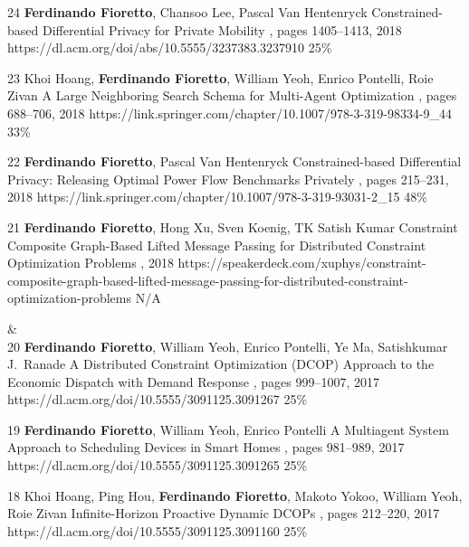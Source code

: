 \begin{pubs}
	\confentry
		{24} %
	  	{{\bf Ferdinando Fioretto}, Chansoo Lee, Pascal Van Hentenryck}
	  	{Constrained-based Differential Privacy for Private Mobility} 
	  	{\procAAMAS, pages 1405--1413, 2018}
	  	{https://dl.acm.org/doi/abs/10.5555/3237383.3237910}
	    {25\%} %

	\confentry 
		{23} %
		{Khoi Hoang, {\bf Ferdinando Fioretto}, William Yeoh, Enrico Pontelli, Roie Zivan}
		{A Large Neighboring Search Schema for Multi-Agent Optimization}
		{\procCP, pages 688--706, 2018}
		{https://link.springer.com/chapter/10.1007/978-3-319-98334-9\_44}
	    {33\%} %

	\confentry 
		{22} %
		{{\bf Ferdinando Fioretto}, Pascal Van Hentenryck}
		{Constrained-based Differential Privacy: Releasing Optimal Power Flow Benchmarks Privately} 
		{\procCPAIOR, pages 215--231, 2018}
		{https://link.springer.com/chapter/10.1007/978-3-319-93031-2\_15}
	    {48\%}

	\confentry
		{21} %
		{{\bf Ferdinando Fioretto}, Hong Xu, Sven Koenig, TK Satish Kumar}
		{Constraint Composite Graph-Based Lifted Message Passing for Distributed Constraint Optimization Problems}
		{\procISIAM, 2018}
		{https://speakerdeck.com/xuphys/constraint-composite-graph-based-lifted-message-passing-for-distributed-constraint-optimization-problems}
		{N/A}

{}&\nemph{\rule{0.5\linewidth}{0.5pt}}\\[1em]
	\confentry 
		{20} %
		{{\bf Ferdinando Fioretto}, William Yeoh, Enrico Pontelli, Ye Ma, Satishkumar J.~Ranade}
		{A Distributed Constraint Optimization (DCOP) Approach to the Economic Dispatch with Demand Response}
		{\procAAMAS, pages  999--1007, 2017}
		{https://dl.acm.org/doi/10.5555/3091125.3091267}
		{25\%}%

	\confentry 
		{19} %
		{{\bf Ferdinando Fioretto},  William Yeoh, Enrico Pontelli}
		{A Multiagent System Approach to Scheduling Devices in Smart Homes}
		{\procAAMAS, pages 981--989, 2017} 
		{https://dl.acm.org/doi/10.5555/3091125.3091265}
		{25\%}%

	\confentry
		{18} %
		{Khoi Hoang, Ping Hou, {\bf Ferdinando Fioretto}, Makoto Yokoo, William Yeoh, Roie Zivan}
		{Infinite-Horizon Proactive Dynamic DCOPs}
		{\procAAMAS, pages 212--220, 2017}
		{https://dl.acm.org/doi/10.5555/3091125.3091160}
		{25\%}%


\end{pubs}
